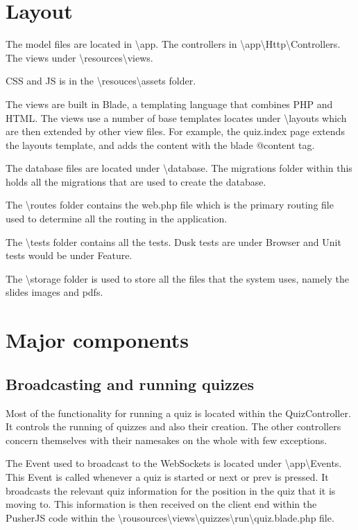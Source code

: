 \section{Layout}
The model files are located in \textbackslash app. The controllers in \textbackslash app\textbackslash Http\textbackslash Controllers. The views under \textbackslash resources\textbackslash views.

CSS  and JS is in the \textbackslash resouces\textbackslash assets folder.

The views are built in Blade, a templating language that combines PHP and HTML. The views use a number of base templates locates under \textbackslash layouts which are then extended by other view files. For example, the quiz.index page extends the layouts template, and adds the content with the blade @content tag.

The database files are located under \textbackslash database. The migrations folder within this holds all the migrations that are used to create the database.

The \textbackslash routes folder contains the web.php file which is the primary routing file used to determine all the routing in the application.

The \textbackslash tests folder contains all the tests. Dusk tests are under Browser and Unit tests would be under Feature.

The \textbackslash storage folder is used to store all the files that the system uses, namely the slides images and pdfs.

\section{Major components}
\subsection{Broadcasting and running quizzes}
Most of the functionality for running a quiz is located within the QuizController. It controls the running of quizzes and also their creation. The other controllers concern themselves with their namesakes on the whole with few exceptions.

The Event used to broadcast to the WebSockets is located under \textbackslash app\textbackslash Events. This Event is called whenever a quiz is started or next or prev is pressed. It broadcasts the relevant quiz information for the position in the quiz that it is moving to. This information is then received on the client end within the PusherJS code within the \textbackslash rousources\textbackslash views\textbackslash quizzes\textbackslash run\textbackslash quiz.blade.php file.

